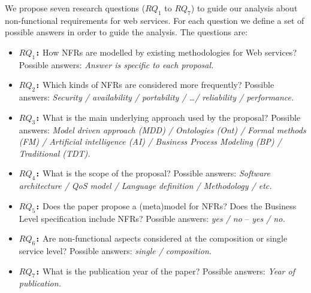 \documentclass[english,12pt]{article}
\begin{document}
We propose seven research questions ($RQ_1$ to $RQ_7$) to guide our analysis about non-functional
requirements for web services. 
For each question we define a set of possible answers in order to guide
the analysis.
The questions are:
\begin{itemize} 
  \item \textbf{\texttt{$RQ_1$:}} How NFRs are modelled by existing
  methodologies for Web services?
Possible answers: \textit{Answer is specific to each proposal.}
 \item \textbf{\texttt{$RQ_2$:}} Which kinds of NFRs are considered more frequently?
	  Possible answers: \textit{Security / availability / portability / \ldots / reliability /
	  performance.}
  \item \textbf{\texttt{$RQ_3$:}} What is the main underlying approach used by the proposal?
Possible answers: \textit{Model driven approach (MDD) / Ontologies (Ont) / Formal methods (FM) / Artificial intelligence (AI) / Business Process Modeling (BP) / Traditional (TDT).}
  \item \textbf{\texttt{$RQ_4$:}} What is the scope of the proposal?
Possible answers: \textit{Software architecture / QoS model / Language definition / Methodology / etc.}
  \item \textbf{\texttt{$RQ_5$:}} Does the paper propose a (meta)model
  for NFRs? Does the Business Level specification include NFRs?  
Possible answers: \textit{yes / no} -- \textit{yes / no.}
  \item \textbf{\texttt{$RQ_6$:}} Are non-functional aspects considered at the composition or single service level?
Possible answers: \textit{single / composition.}
\item \textbf{\texttt{$RQ_7$:}} What is the publication year of the paper?
Possible answers: \textit{Year of publication.}
\end{itemize}
\end{document}

